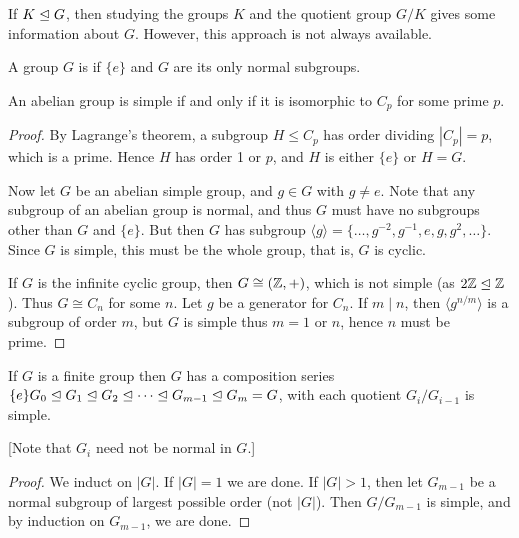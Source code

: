 \documentclass[a4paper]{scrreprt}
\begin{document}
If $K \trianglelefteq G$, then studying the groups $K$ and the quotient group $G/K$ gives some information about $G$. However, this approach is not always available.

\begin{definition}
	A group $G$ is  if $\{e\}$ and $G$ are its only normal subgroups.
\end{definition}

\begin{lemma}
	An abelian group is simple if and only if it is isomorphic to $C_p$ for some prime $p$.
\end{lemma}
\begin{proof}
	By Lagrange's theorem, a subgroup $H \leq C_p$ has order dividing $|C_p| = p$, which is a prime. Hence $H$ has order 1 or $p$, and $H$ is either $\{e\}$ or $H = G$.

	Now let $G$ be an abelian simple group, and $g \in G$ with $g \neq e$. Note that any subgroup of an abelian group is normal, and thus $G$ must have no subgroups other than $G$ and $\{e\}$. But then $G$ has subgroup $\langle g \rangle = \{\dots, g^{-2}, g^{-1}, e, g, g^2, \dots \}$. Since $G$ is simple, this must be the whole group, that is, $G$ is cyclic.

	If $G$ is the infinite cyclic group, then $G \cong (\mathbb{Z}, +)$, which is not simple (as $2 \mathbb{Z} \trianglelefteq \mathbb{Z}$). Thus $G \cong C_n$ for some $n$. Let $g$ be a generator for $C_n$. If $m \mid n$, then $\langle g^{n/m} \rangle$ is a subgroup of order $m$, but $G$ is simple thus $m = 1$ or $n$, hence $n$ must be prime.
\end{proof}

\begin{lemma}
	If $G$ is a finite group then $G$ has a composition series $\{e\} G_0 \trianglelefteq G_1 \trianglelefteq G_2 \trianglelefteq \cdots \trianglelefteq G_{m- 1} \trianglelefteq G_m = G$, with each quotient $G_i / G_{i - 1}$ is simple.

	[Note that $G_i$ need not be normal in $G$.]
\end{lemma}
\begin{proof}
	We induct on $|G|$. If $|G| = 1$ we are done. If $|G| > 1$, then let $G_{m - 1}$ be a normal subgroup of largest possible order (not $|G|$). Then $G/G_{m - 1}$ is simple, and by induction on $G_{m - 1}$, we are done.
\end{proof}
\end{document}
